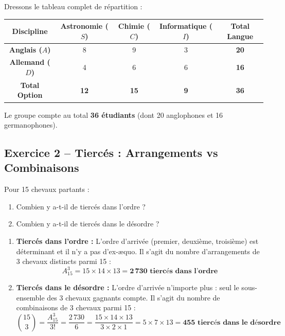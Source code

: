 \documentclass[11pt,a4paper]{article}
\begin{document}
\begin{correctionbox}
Dressons le tableau complet de répartition :
\begin{center}
\renewcommand{\arraystretch}{1.35}
\begin{tabular}{|c|c|c|c||c|}
    \hline
    \textbf{Discipline} & \textbf{Astronomie ($S$)} & \textbf{Chimie ($C$)} & \textbf{Informatique ($I$)} & \textbf{Total Langue} \\
    \hline
    \textbf{Anglais ($A$)} & 8 & 9 & 3 & \textbf{20} \\
    \hline
    \textbf{Allemand ($D$)} & 4 & 6 & 6 & \textbf{16} \\
    \hline\hline
    \textbf{Total Option} & \textbf{12} & \textbf{15} & \textbf{9} & \textbf{36} \\
    \hline
\end{tabular}
\end{center}
Le groupe compte au total \textbf{36 étudiants} (dont 20 anglophones et 16 germanophones).
\end{correctionbox}

\vspace{0.3cm}

\subsection*{Exercice 2 -- Tiercés : Arrangements vs Combinaisons}

Pour 15 chevaux partants :
\begin{enumerate}[label=\arabic*.]
    \item Combien y a-t-il de tiercés dans l'ordre ?
    \item Combien y a-t-il de tiercés dans le désordre ?
\end{enumerate}

\begin{correctionbox}
\begin{enumerate}[label=\arabic*.]
    \item \textbf{Tiercés dans l'ordre :}
    L'ordre d'arrivée (premier, deuxième, troisième) est déterminant et il n'y a pas d'ex-æquo.
    Il s'agit du nombre d'arrangements de 3 chevaux distincts parmi 15 :
    \[
    A_{15}^3 = 15 \times 14 \times 13 = \mathbf{2\,730\text{ tiercés dans l'ordre}}
    \]

    \item \textbf{Tiercés dans le désordre :}
    L'ordre d'arrivée n'importe plus : seul le sous-ensemble des 3 chevaux gagnants compte.
    Il s'agit du nombre de combinaisons de 3 chevaux parmi 15 :
    \[
    \binom{15}{3} = \frac{A_{15}^3}{3!} = \frac{2\,730}{6} = \frac{15 \times 14 \times 13}{3 \times 2 \times 1} = 5 \times 7 \times 13 = \mathbf{455\text{ tiercés dans le désordre}}
    \]
\end{enumerate}
\end{correctionbox}
\end{document}
